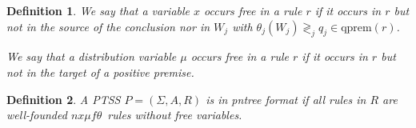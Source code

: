 \documentclass[submission,copyright,creativecommons]{eptcs}
\newtheorem{definition}{Definition}
\newcommand{\qprem}[1]{\textrm{qprem}(#1)}
\newcommand{\nxmuft}{\ensuremath{\textit{nx}\mu\textit{f}\theta}}
\newcommand{\colorpar}[3]{\colorbox{#1}{\parbox{#2}{#3}}}
\newcommand{\marginremark}[3]{\marginpar{\colorpar{#2}{\linewidth}{\color{#1}#3}}}
\newcommand{\remarkDG}[1]{\marginremark{darkgreen}{lightyellow}{\tiny{[DG]~ #1}}}
\renewcommand{\remarkDG}[1]{}
\begin{document}
\begin{definition}
We say that a variable $x$ occurs \emph{free} in a rule $r$ if it
occurs in $r$ but not in the source of the conclusion nor in 
$W_j$ with $\theta_j(W_j) \gtrless_j q_j \in \qprem{r}$. 
\remarkDG{Does a instantiable dirac distribution $\delta_x$ as part of $\theta_j$ not also bind a variable and this should be included in the def?}
We say that a distribution variable $\mu$ occurs \emph{free} in a rule $r$ if it occurs in $r$ 
but not in the target of a positive premise. \end{definition}

\begin{definition}
 A PTSS $P = (\Sigma, A, R)$ is in \emph{pntree format} if
 all rules in $R$ are well-founded \nxmuft\ rules without free variables. 
\end{definition}
\end{document}
